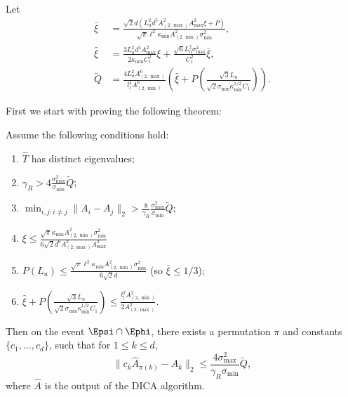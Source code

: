 Let 
\begin{align*}
\bar{\xi} &=   \frac{\sqrt{2}d\left(L_u^2d^5 A_{(2,\max)}^2A_{\max}^2\xi + P\right)}{\sqrt{\pi}\ell^2\kappa_{\min}A^2_{(2,\min)}\sigma_{\min}^2}, \\
\hat{\xi} &= \frac{3L_u^2d^5A^2_{\max}}{2\kappa_{\min}C_1^2}\xi + \frac{\sqrt{6}L_u^2\sigma_{\max}^2}{C_1^2}\bar{\xi}, \\
 \tilde{Q} &=  
 \frac{4L_u^2A^6_{(2,\max)}}{l_l^4 A^6_{(2,\min)}}\left(\hat{\xi}
 +
 P\left(\frac{\sqrt{3}L_u}{\sqrt{2}\sigma_{\min}\kappa_{\min}^{1/2}C_1}\right)\right).
\end{align*} 

First we start with proving the following theorem:
\begin{thm}
\label{thm:Modefficiency}
 Assume the following conditions hold:
 \begin{enumerate}
 \vspace{-3mm}
 \item $\hat{T}$ has distinct eigenvalues;
 \item $\gamma_R > 4 \frac{\sigma_{\max}^2}{\sigma_{\min} }\tilde{Q}$; 
 \item $\min_{i,j:i\neq j} \|A_i - A_j\|_2 > \frac{8}{\gamma_R}\frac{\sigma_{\max}^2}{\sigma_{\min} } \tilde{Q}$;
 \item $\xi \le \frac{\sqrt{\pi}\kappa_{\min}A^2_{(2,\min)}\sigma_{\min}^2}{6\sqrt{2}d^6A_{(2,\max)}^2A_{\max}^2}$
 \item $P(L_u) \le \frac{\sqrt{\pi}\ell^2\kappa_{\min}A^2_{(2,\min)}\sigma_{\min}^2}{6\sqrt{2}d}$
 (so $\bar{\xi} \le 1/3$);
 \item $\hat{\xi}
  +
  P\left(\frac{\sqrt{3}L_u}{\sqrt{2}\sigma_{\min}\kappa_{\min}^{1/2}C_1}\right) \le \frac{l_l^2 A^2_{(2,\min)}}{2A^2_{(2,\max)}}$.
 \end{enumerate}
 \vspace{-2mm}
Then on the event $\Epsi \cap\Ephi$, there exists a permutation $\pi$ and constants $\{c_1,\ldots,c_d\}$, such that for $1\le k\le d$,
\[
\| c_k\hat{A}_{\pi(k)} - A_k\|_2 \le \frac{4\sigma^2_{\max}}{\gamma_R\sigma_{\min}} \tilde{Q},
\]
where $\hat{A}$ is the output of the DICA algorithm.
\end{thm}

